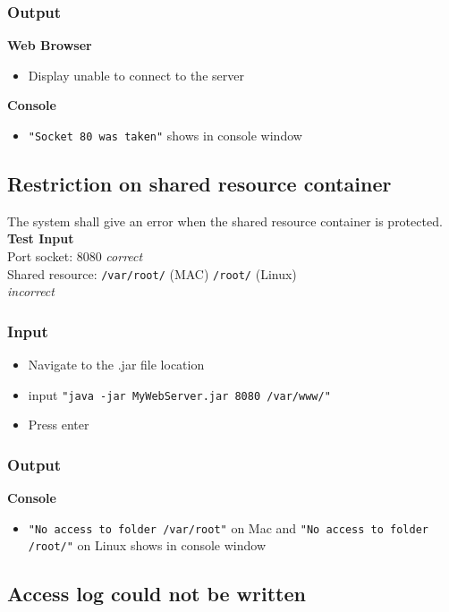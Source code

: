 \documentclass[a4paper, 12pt]{article}
\begin{document}
\subsubsection{Output}
\textbf{Web Browser}
\begin{itemize}
\item Display unable to connect to the server
\end{itemize}

\textbf{Console}
\begin{itemize}
\item \texttt{"Socket 80 was taken"} shows in console window
\end{itemize}

\subsection{Restriction on shared resource container}

The system shall give an error when the shared resource container is protected.\\
\textbf{Test Input} \\ Port socket: 8080 \textit{correct} \\ Shared resource: \texttt{/var/root/} (MAC) \texttt{/root/} (Linux) \\ \textit{incorrect}
 
\subsubsection{Input}
\begin{itemize}
\item Navigate to the .jar file location
\item input \texttt{"java -jar MyWebServer.jar 8080 /var/www/"}
\item Press enter
\end{itemize} 

\subsubsection{Output}
\textbf{Console}
\begin{itemize}
\item \texttt{"No access to folder /var/root"} on Mac and \texttt{"No access to folder /root/"} on Linux shows in console window
\end{itemize}

\subsection{Access log could not be written}
\end{document}

